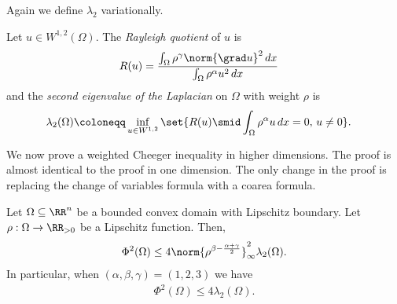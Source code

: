 Again we define $\lambda_2$ variationally.
\begin{definition}
Let $u\in W^{1,2}(\Omega)$. The \textit{Rayleigh quotient} of $u$ is
\begin{align*}
R(u) &= \frac{\int_\Omega \rho^\gamma\norm{\grad u}^2\,dx}{\int_\Omega \rho^\alpha u^2\,dx}
\end{align*}
and the \textit{second eigenvalue of the Laplacian} on $\Omega$ with weight $\rho$ is
\begin{align*}
\lambda_2(\Omega) &\coloneqq \inf_{u\in W^{1,2}}\set{R(u) \smid \int_\Omega \rho^\alpha u \,dx = 0,\, u\neq 0}.
\end{align*}
\end{definition}

We now prove a weighted Cheeger inequality in higher dimensions. The proof is almost identical to the proof in one dimension. The only change in the proof is replacing the change of variables formula with a coarea formula.
\begin{theorem} \label{thm:Acheeger_n}
Let $\Omega\subseteq\RR^n$ be a bounded convex domain with Lipschitz boundary. Let $\rho:{\Omega}\to\RR_{>0}$ be a Lipschitz function. Then,
\begin{align*}
\Phi^2(\Omega) \leq 4 \norm{\rho^{\beta - \frac{\alpha+\gamma}{2}}}^2_\infty \lambda_2(\Omega).
\end{align*}
In particular, when $(\alpha,\beta,\gamma) = (1,2,3)$ we have
\begin{align*}
\Phi^{2}(\Omega) \leq 4\lambda_2(\Omega).
\end{align*}
\end{theorem}
